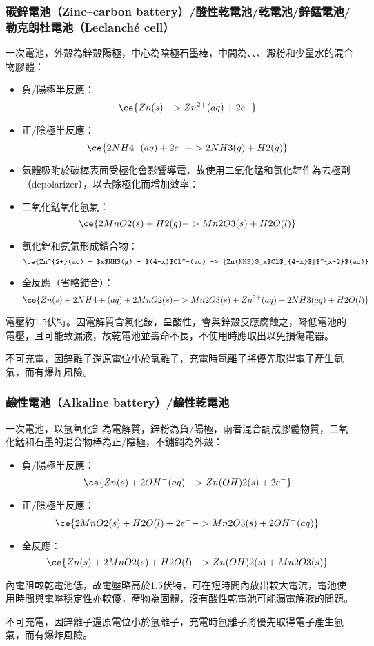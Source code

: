 \documentclass[a4paper,12pt]{report}
\begin{document}
\begin{itemize}
\begin{itemize}
\subsubsection{碳鋅電池（Zinc–carbon battery）/酸性乾電池/乾電池/鋅錳電池/勒克朗杜電池（Leclanché cell） }
一次電池，外殼為鋅殼陽極，中心為陰極石墨棒，中間為、、、澱粉和少量水的混合物膠體：
\begin{itemize}
\item 負/陽極半反應：
\[\ce{Zn(s) -> Zn^{2+}(aq) + 2e^-}\]
\item 正/陰極半反應：
\[\ce{2NH4^+(aq) + 2e^- -> 2NH3(g) + H2(g)}\]
\item 氣體吸附於碳棒表面受極化會影響導電，故使用二氧化錳和氯化鋅作為去極劑（depolarizer），以去除極化而增加效率：
\bit
\item 二氧化錳氧化氫氣：
\[\ce{2MnO2(s) + H2(g) -> Mn2O3(s) + H2O(l)}\]
\item 氯化鋅和氨氣形成錯合物：
\[\ce{Zn^{2+}(aq) + $x$NH3(g) + $(4-x)$Cl^-(aq) -> [Zn(NH3)$_x$Cl$_{4-x}$]$^{x-2}$(aq)}\]
\eit
\item 全反應（省略錯合）：
\[\ce{Zn(s) + 2NH4+(aq) + 2MnO2(s) -> Mn2O3(s) + Zn^{2+}(aq) + 2NH3(aq) + H2O(l)}\]
\end{itemize}
電壓約1.5伏特。因電解質含氯化銨，呈酸性，會與鋅殼反應腐蝕之，降低電池的電壓，且可能致漏液，故乾電池並壽命不長，不使用時應取出以免損傷電器。

不可充電，因鋅離子還原電位小於氫離子，充電時氫離子將優先取得電子產生氫氣，而有爆炸風險。
\subsubsection{鹼性電池（Alkaline battery）/鹼性乾電池}
一次電池，以氫氧化鉀為電解質，鋅粉為負/陽極，兩者混合調成膠體物質，二氧化錳和石墨的混合物棒為正/陰極，不鏽鋼為外殼：
\begin{itemize}
\item 負/陽極半反應：
\[\ce{Zn(s) + 2OH^-(aq) -> Zn(OH)2(s) + 2e^-}\]
\item 正/陰極半反應：
\[\ce{2MnO2(s) + H2O(l) + 2e^- -> Mn2O3(s) + 2OH^-(aq)}\]
\item 全反應：
\[\ce{Zn(s) + 2MnO2(s) + H2O(l) -> Zn(OH)2(s) + Mn2O3(s)}\]
\end{itemize}
內電阻較乾電池低，故電壓略高於1.5伏特，可在短時間內放出較大電流，電池使用時間與電壓穩定性亦較優，產物為固體，沒有酸性乾電池可能漏電解液的問題。

不可充電，因鋅離子還原電位小於氫離子，充電時氫離子將優先取得電子產生氫氣，而有爆炸風險。

\end{itemize}
\end{itemize}
\end{document}
